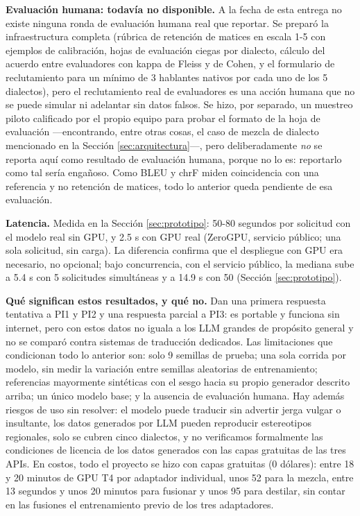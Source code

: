 \documentclass[11pt,a4paper]{article}
\begin{document}
\textbf{Evaluación humana: todavía no disponible.} A la fecha de esta entrega no existe ninguna ronda de evaluación humana real que reportar. Se preparó la infraestructura completa (rúbrica de retención de matices en escala 1-5 con ejemplos de calibración, hojas de evaluación ciegas por dialecto, cálculo del acuerdo entre evaluadores con kappa de Fleiss y de Cohen, y el formulario de reclutamiento para un mínimo de 3 hablantes nativos por cada uno de los 5 dialectos), pero el reclutamiento real de evaluadores es una acción humana que no se puede simular ni adelantar sin datos falsos. Se hizo, por separado, un muestreo piloto calificado por el propio equipo para probar el formato de la hoja de evaluación ---encontrando, entre otras cosas, el caso de mezcla de dialecto mencionado en la Sección \ref{sec:arquitectura}---, pero deliberadamente \emph{no} se reporta aquí como resultado de evaluación humana, porque no lo es: reportarlo como tal sería engañoso. Como BLEU y chrF miden coincidencia con una referencia y no retención de matices, todo lo anterior queda pendiente de esa evaluación.

\textbf{Latencia.} Medida en la Sección \ref{sec:prototipo}: 50-80 segundos por solicitud con el modelo real sin GPU, y 2.5 s con GPU real (ZeroGPU, servicio público; una sola solicitud, sin carga). La diferencia confirma que el despliegue con GPU era necesario, no opcional; bajo concurrencia, con el servicio público, la mediana sube a 5.4 s con 5 solicitudes simultáneas y a 14.9 s con 50 (Sección \ref{sec:prototipo}).

\textbf{Qué significan estos resultados, y qué no.} Dan una primera respuesta tentativa a PI1 y PI2 y una respuesta parcial a PI3: es portable y funciona sin internet, pero con estos datos no iguala a los LLM grandes de propósito general y no se comparó contra sistemas de traducción dedicados. Las limitaciones que condicionan todo lo anterior son: solo 9 semillas de prueba; una sola corrida por modelo, sin medir la variación entre semillas aleatorias de entrenamiento; referencias mayormente sintéticas con el sesgo hacia su propio generador descrito arriba; un único modelo base; y la ausencia de evaluación humana. Hay además riesgos de uso sin resolver: el modelo puede traducir sin advertir jerga vulgar o insultante, los datos generados por LLM pueden reproducir estereotipos regionales, solo se cubren cinco dialectos, y no verificamos formalmente las condiciones de licencia de los datos generados con las capas gratuitas de las tres APIs. En costos, todo el proyecto se hizo con capas gratuitas (0 dólares): entre 18 y 20 minutos de GPU T4 por adaptador individual, unos 52 para la mezcla, entre 13 segundos y unos 20 minutos para fusionar y unos 95 para destilar, sin contar en las fusiones el entrenamiento previo de los tres adaptadores.
\end{document}
